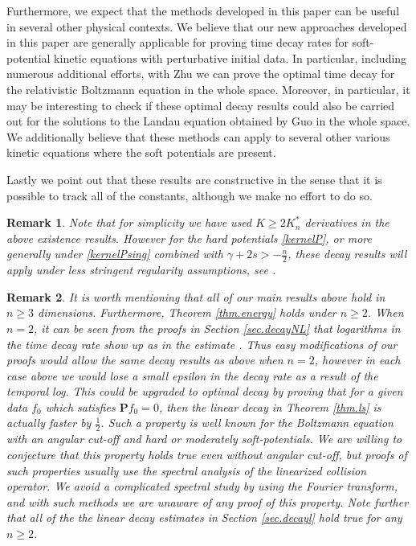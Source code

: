 \documentclass{amsart}
\newtheorem{remark}{Remark}[section]
\numberwithin{equation}{section}
\begin{document}
Furthermore,  we expect that the methods developed in this paper can be useful in several other physical contexts.   We believe that our new approaches developed in this paper are generally applicable for proving time decay rates for soft-potential kinetic equations with perturbative initial data.
In particular, including numerous additional efforts, with Zhu we can prove the optimal time decay for the relativistic Boltzmann equation \cite{ZhuStrain} in the whole space.  Moreover, in particular, it may be interesting to check if these optimal decay results could also be carried out for the solutions to the Landau equation obtained by Guo \cite{MR1946444} in the whole space.  
We additionally believe that these methods can apply to several other various kinetic equations where the soft potentials are present.

Lastly we point out that these results are constructive in the sense that it is possible to track all of the constants, although we make no effort to do so.

\begin{remark}
Note that for simplicity we have used ${{K \ge 2{K^*_n}}}$ derivatives in the above existence results.  However for the hard potentials \eqref{kernelP}, or more generally under \eqref{kernelPsing} combined with $\gamma + 2s > -\frac{n}{2}$, these decay results will apply under less stringent regularity assumptions, see \cite{gsNonCut0}.
\end{remark}

\begin{remark}
It is worth mentioning that all of our main results above hold in ${{n} \ge 3}$ dimensions.   Furthermore, Theorem \ref{thm.energy} holds under ${n} \ge 2$.  When ${n} =2$, it can be seen from the proofs in Section \ref{sec.decayNL}
that logarithms in the time decay rate show up as in the estimate \cite[Proposition 4.5]{strainSOFT}.   Thus easy modifications of our proofs would allow the same decay results as above when ${n} =2$, however in each case above we would lose a small epsilon in the decay rate as a result of the temporal log.  This could be upgraded to optimal decay by proving that for a given data ${f}_0$ which satisfies ${\mathbf{P}} {f}_0 =0$, then the linear decay in Theorem \ref{thm.ls} is actually faster by $\frac{1}{2}$.  Such a property is well known for the Boltzmann equation \cite{MR677262,MR0363332} with an angular cut-off and hard or moderately soft-potentials. We are willing to conjecture that this property holds true even without angular cut-off, but proofs of such properties usually use the spectral analysis of the linearized collision operator.  We avoid a complicated spectral study by using the Fourier transform, and with such methods we are unaware of any proof of this property.    Note further that all of the the linear decay estimates in Section \ref{sec.decayl} hold true for any ${n} \ge 2$. 
\end{remark}
\end{document}

